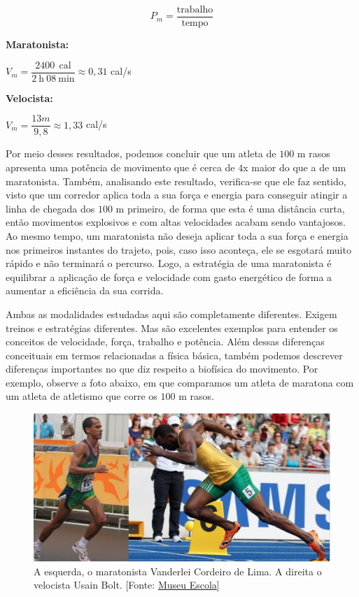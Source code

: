 \begin{multicols}{2}
\begin{equation*}
    P_{m} = \dfrac{\text{trabalho}}{\text{tempo}}
\end{equation*}

\noindent\textbf{Maratonista:}\par

$V_m = \dfrac{2400\: \: \text{cal}}{2\: \text{h} \: 08 \: \text{min}} \approx  0,31$ cal/s

\noindent\textbf{Velocista:}\par

$V_m = \dfrac{13 m}{9,8} \approx 1,33$ cal/s

Por meio desses resultados, podemos concluir que um atleta de $100$ m rasos apresenta uma potência de movimento que é cerca de $4$x maior do que a de um maratonista. Também, analisando este resultado, verifica-se que ele faz sentido, visto que um corredor aplica toda a sua força e energia para conseguir atingir a linha de chegada dos $100$ m primeiro, de forma que esta é uma distância curta, então movimentos explosivos e com altas velocidades acabam sendo vantajosos. Ao mesmo tempo, um maratonista não deseja aplicar toda a sua força e energia nos primeiros instantes do trajeto, pois, caso isso aconteça, ele se esgotará muito rápido e não terminará o percurso. Logo, a estratégia de uma maratonista é equilibrar a aplicação de força e velocidade com gasto energético de forma a aumentar a eficiência da sua corrida. 

Ambas as modalidades estudadas aqui são completamente diferentes. Exigem treinos e estratégias diferentes. Mas são excelentes exemplos para entender os conceitos de velocidade, força, trabalho e potência.  Além dessas diferenças conceituais em termos relacionadas a física básica, também podemos descrever diferenças importantes no que diz respeito a biofísica do movimento. Por exemplo, observe a foto abaixo, em que comparamos um atleta de maratona com um atleta de atletismo que corre os $100$ m rasos.

\begin{figure}[H]
    \centering
    \includegraphics[width=\linewidth]{Figuras/Artigo4/corredores.jpeg}
    \caption{A esquerda, o maratonista Vanderlei Cordeiro de Lima. A direita o velocista Usain Bolt. [Fonte:  \href{https://museuescola.ibb.unesp.br/subtopico.php?id=2&pag=2&num=3&sub=25}{Museu Escola}]}
    \label{corredores2}
\end{figure}


\end{multicols}

